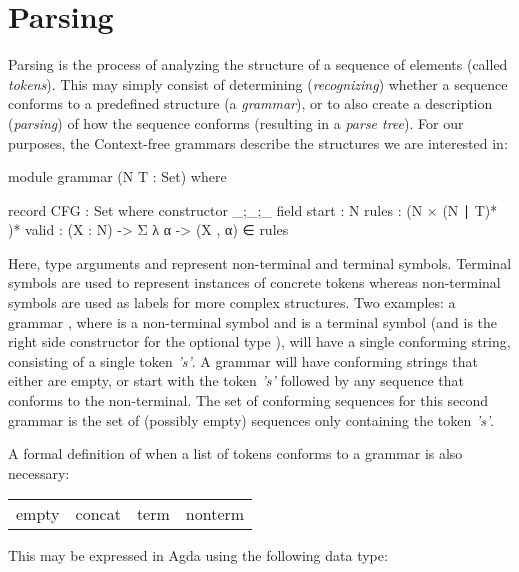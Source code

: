 \chapter{Parsing} \label{Parsing}

	Parsing is the process of analyzing the structure of a sequence of elements
	(called \emph{tokens}). This may simply consist of determining
	(\emph{recognizing}) whether a sequence conforms to a predefined structure
	(a \emph{grammar}), or to also create a description (\emph{parsing}) of how
	the sequence conforms (resulting in a \emph{parse tree}). For our
	purposes, the Context-free grammars describe the structures we are
	interested in:

	\begin{code}
		module grammar (N T : Set) where

		record CFG : Set where
		  constructor _;_;_
		  field
		    start : N
		    rules : (N × (N ∣ T)* )*
    		valid : (X : N) -> Σ λ α -> (X , α) ∈ rules
	\end{code}

	Here, type arguments  and  represent non-terminal and
	terminal symbols. Terminal symbols are used to represent instances of
	concrete tokens whereas non-terminal symbols are used as labels for more
	complex structures. Two examples: a grammar , where  is a non-terminal symbol and  is a
	terminal symbol (and  is the right side constructor for the
	optional type \codett{|}), will have a single conforming string, consisting
	of a single token \emph{'s'}. A grammar  will have conforming strings that either are empty, or
	start with the token \emph{'s'} followed by any sequence that conforms to
	the  non-terminal. The set of conforming sequences for this second
	grammar is the set of (possibly empty) sequences only containing the token
	\emph{'s'}.

	A formal definition of when a list of tokens conforms to a grammar is also
	necessary:

	\begin{table}[h]
		\centering
		\begin{tabular}{cccc}
			 empty & concat & term & nonterm
		\end{tabular}
	\end{table}

	This may be expressed in Agda using the following data type:

